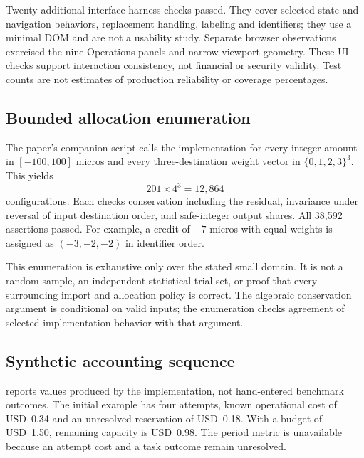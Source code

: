 \documentclass[10pt,twocolumn]{article}
\begin{document}
Twenty additional interface-harness checks passed. They cover selected state and navigation behaviors, replacement handling, labeling and identifiers; they use a minimal DOM and are not a usability study. Separate browser observations exercised the nine Operations panels and narrow-viewport geometry. These UI checks support interaction consistency, not financial or security validity. Test counts are not estimates of production reliability or coverage percentages.

\subsection{Bounded allocation enumeration}

The paper's companion script calls the implementation for every integer amount in $[-100,100]$ micros and every three-destination weight vector in $\{0,1,2,3\}^3$. This yields
\begin{equation}
201\times4^3=12{,}864
\end{equation}
configurations. Each checks conservation including the residual, invariance under reversal of input destination order, and safe-integer output shares. All 38,592 assertions passed. For example, a credit of $-7$ micros with equal weights is assigned as $(-3,-2,-2)$ in identifier order.

This enumeration is exhaustive only over the stated small domain. It is not a random sample, an independent statistical trial set, or proof that every surrounding import and allocation policy is correct. The algebraic conservation argument is conditional on valid inputs; the enumeration checks agreement of selected implementation behavior with that argument.

\subsection{Synthetic accounting sequence}

 reports values produced by the implementation, not hand-entered benchmark outcomes. The initial example has four attempts, known operational cost of USD~0.34 and an unresolved reservation of USD~0.18. With a budget of USD~1.50, remaining capacity is USD~0.98. The period metric is unavailable because an attempt cost and a task outcome remain unresolved.
\end{document}

